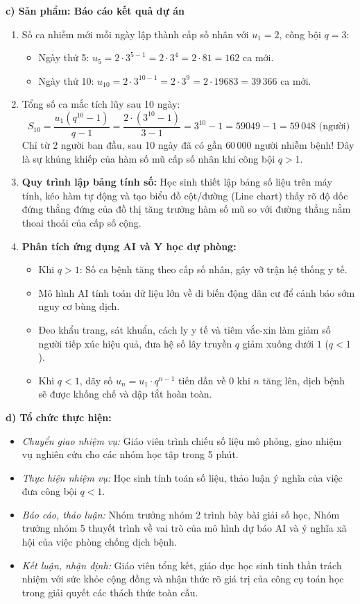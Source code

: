 \documentclass[12pt, a4paper]{article}
\begin{document}
\noindent \textbf{c) Sản phẩm: Báo cáo kết quả dự án}
\begin{enumerate}[leftmargin=0.6cm]
    \item Số ca nhiễm mới mỗi ngày lập thành cấp số nhân với $u_1 = 2$, công bội $q = 3$:
    \begin{itemize}
        \item Ngày thứ 5: $u_5 = 2 \cdot 3^{5-1} = 2 \cdot 3^4 = 2 \cdot 81 = 162$ ca mới.
        \item Ngày thứ 10: $u_{10} = 2 \cdot 3^{10-1} = 2 \cdot 3^9 = 2 \cdot 19683 = 39\,366$ ca mới.
    \end{itemize}
    \item Tổng số ca mắc tích lũy sau 10 ngày:
    $$S_{10} = \dfrac{u_1(q^{10} - 1)}{q - 1} = \dfrac{2 \cdot (3^{10} - 1)}{3 - 1} = 3^{10} - 1 = 59049 - 1 = 59\,048\text{ (người)}$$
    Chỉ từ 2 người ban đầu, sau 10 ngày đã có gần $60\,000$ người nhiễm bệnh! Đây là sự khủng khiếp của hàm số mũ cấp số nhân khi công bội $q > 1$.
    \item \textbf{Quy trình lập bảng tính số:}
    Học sinh thiết lập bảng số liệu trên máy tính, kéo hàm tự động và tạo biểu đồ cột/đường (Line chart) thấy rõ độ dốc đứng thẳng đứng của đồ thị tăng trưởng hàm số mũ so với đường thẳng nằm thoai thoải của cấp số cộng.
    \item \textbf{Phân tích ứng dụng AI và Y học dự phòng:}
    \begin{itemize}
        \item Khi $q > 1$: Số ca bệnh tăng theo cấp số nhân, gây vỡ trận hệ thống y tế.
        \item Mô hình AI tính toán dữ liệu lớn về di biến động dân cư để cảnh báo sớm nguy cơ bùng dịch.
        \item Đeo khẩu trang, sát khuẩn, cách ly y tế và tiêm vắc-xin làm giảm số người tiếp xúc hiệu quả, đưa hệ số lây truyền $q$ giảm xuống dưới $1$ ($q < 1$).
        \item Khi $q < 1$, dãy số $u_n = u_1 \cdot q^{n-1}$ tiến dần về $0$ khi $n$ tăng lên, dịch bệnh sẽ được khống chế và dập tắt hoàn toàn.
    \end{itemize}
\end{enumerate}

\noindent \textbf{d) Tổ chức thực hiện:}
\begin{itemize}[leftmargin=0.8cm]
    \item \textit{Chuyển giao nhiệm vụ:} Giáo viên trình chiếu số liệu mô phỏng, giao nhiệm vụ nghiên cứu cho các nhóm học tập trong 5 phút.
    \item \textit{Thực hiện nhiệm vụ:} Học sinh tính toán số liệu, thảo luận ý nghĩa của việc đưa công bội $q < 1$.
    \item \textit{Báo cáo, thảo luận:} Nhóm trưởng nhóm 2 trình bày bài giải số học, Nhóm trưởng nhóm 5 thuyết trình về vai trò của mô hình dự báo AI và ý nghĩa xã hội của việc phòng chống dịch bệnh.
    \item \textit{Kết luận, nhận định:} Giáo viên tổng kết, giáo dục học sinh tinh thần trách nhiệm với sức khỏe cộng đồng và nhận thức rõ giá trị của công cụ toán học trong giải quyết các thách thức toàn cầu.
\end{itemize}
\end{document}
